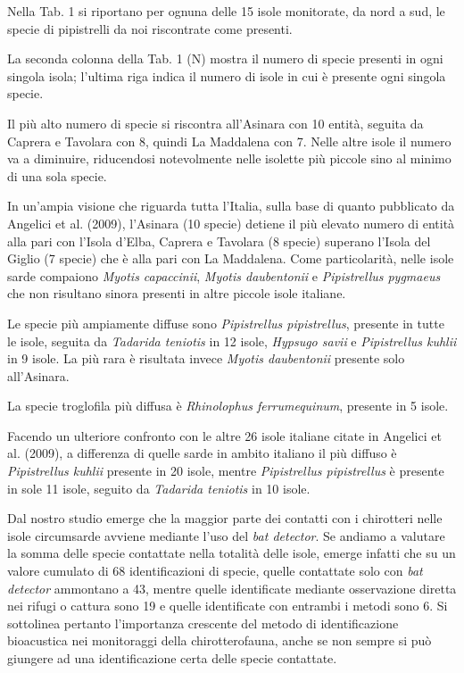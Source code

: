 \begin{multicols}{2}
\begin{compactdesc}
Nella Tab. 1 si riportano per ognuna delle 15 isole monitorate, da nord a sud, le specie di pipistrelli da noi riscontrate come presenti. 

La seconda colonna della Tab. 1 (N\degree{}) mostra il numero di specie presenti in ogni singola isola; l’ultima riga indica il numero di isole in cui è presente ogni singola specie.

Il più alto numero di specie si riscontra all’Asinara con 10 entità, seguita da Caprera e Tavolara con 8, quindi La Maddalena con 7. Nelle altre isole il numero va a diminuire, riducendosi notevolmente nelle isolette più piccole sino al minimo di una sola specie.

In un’ampia visione che riguarda tutta l’Italia, sulla base di quanto pubblicato da Angelici et al. (2009), l’Asinara (10 specie) detiene il più elevato numero di entità alla pari con l’Isola d’Elba, Caprera e Tavolara (8 specie) superano l’Isola del Giglio (7 specie) che è alla pari con La Maddalena. Come particolarità, nelle isole sarde compaiono \emph{Myotis capaccinii}, \emph{Myotis daubentonii} e \emph{Pipistrellus pygmaeus} che non risultano sinora presenti in altre piccole isole italiane.

Le specie più ampiamente diffuse sono \emph{Pipistrellus pipistrellus}, presente in tutte le isole, seguita da \emph{Tadarida teniotis} in 12 isole, \emph{Hypsugo savii} e \emph{Pipistrellus kuhlii} in 9 isole. La più rara è risultata invece \emph{Myotis daubentonii} presente solo all’Asinara.

La specie troglofila più diffusa è \emph{Rhinolophus ferrumequinum}, presente in 5 isole.

Facendo un ulteriore confronto con le altre 26 isole italiane citate in Angelici et al. (2009), a differenza di quelle sarde in ambito italiano il più diffuso è \emph{Pipistrellus kuhlii} presente in 20 isole, mentre \emph{Pipistrellus pipistrellus} è presente in sole 11 isole, seguito da \emph{Tadarida teniotis} in 10 isole. 

Dal nostro studio emerge che la maggior parte dei contatti con i chirotteri nelle isole circumsarde avviene mediante l’uso del \textit{bat detector}. Se andiamo a valutare la somma delle specie contattate nella totalità delle isole, emerge infatti che su un valore cumulato di 68 identificazioni di specie, quelle contattate solo con \textit{bat detector} ammontano a 43, mentre quelle identificate mediante osservazione diretta nei rifugi o cattura sono 19 e quelle identificate con entrambi i metodi sono 6. Si sottolinea pertanto l’importanza crescente del metodo di identificazione bioacustica nei monitoraggi della chirotterofauna, anche se non sempre si può giungere ad una identificazione certa delle specie contattate.


\end{compactdesc}
\end{multicols}
